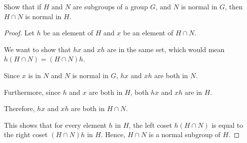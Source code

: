 \documentclass[12pt]{amsart}
\theoremstyle{definition}
\numberwithin{equation}{section}
\theoremstyle{plain}
\begin{document}
\vspace*{20pt}
\begin{exercise}{35} Show that if $H$ and $N$ are subgroups of a group $G$, and $N$ is normal in $G$, then $H \cap N$ is normal in $H$.
    \begin{proof}
    Let \( h \) be an element of \( H \) and \( x \) be an element of \( H \cap N \).
    
    We want to show that \( hx \) and \( xh \) are in the same set, which would mean \( h(H \cap N) = (H \cap N)h \).
    
    Since \( x \) is in \( N \) and \( N \) is normal in \( G \), \( hx \) and \( xh \) are both in \( N \).
    
    Furthermore, since \( h \) and \( x \) are both in \( H \), both \( hx \) and \( xh \) are in \( H \).
    
    Therefore, \( hx \) and \( xh \) are both in \( H \cap N \).
    
    This shows that for every element \( h \) in \( H \), the left coset \( h(H \cap N) \) is equal to the right coset \( (H \cap N)h \) in \( H \). Hence, \( H \cap N \) is a normal subgroup of \( H \).
    \end{proof}
\end{exercise}
\vspace*{20pt}
\end{document}
